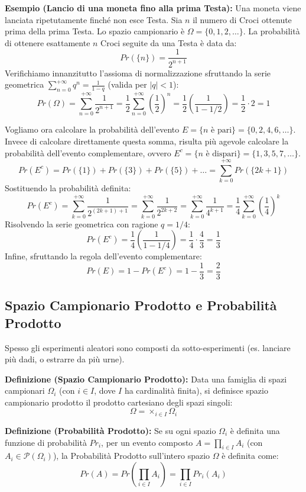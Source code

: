 \documentclass[12pt, a4paper]{article}
\begin{document}
\textbf{Esempio (Lancio di una moneta fino alla prima Testa):}
Una moneta viene lanciata ripetutamente finché non esce Testa. Sia $n$ il numero di Croci ottenute prima della prima Testa. Lo spazio campionario è $\Omega = \{0, 1, 2, \dots\}$.
La probabilità di ottenere esattamente $n$ Croci seguite da una Testa è data da:
$$ Pr(\{n\}) = \frac{1}{2^{n+1}} $$
Verifichiamo innanzitutto l'assioma di normalizzazione sfruttando la serie geometrica $\sum_{n=0}^{+\infty} q^n = \frac{1}{1-q}$ (valida per $|q| < 1$):
$$ Pr(\Omega) = \sum_{n=0}^{+\infty} \frac{1}{2^{n+1}} = \frac{1}{2} \sum_{n=0}^{+\infty} \left(\frac{1}{2}\right)^n = \frac{1}{2} \left( \frac{1}{1 - 1/2} \right) = \frac{1}{2} \cdot 2 = 1 $$

Vogliamo ora calcolare la probabilità dell'evento $E = \{n \text{ è pari}\} = \{0, 2, 4, 6, \dots\}$.
Invece di calcolare direttamente questa somma, risulta più agevole calcolare la probabilità dell'evento complementare, ovvero $E^c = \{n \text{ è dispari}\} = \{1, 3, 5, 7, \dots\}$.
$$ Pr(E^c) = Pr(\{1\}) + Pr(\{3\}) + Pr(\{5\}) + \dots = \sum_{k=0}^{+\infty} Pr(\{2k+1\}) $$
Sostituendo la probabilità definita:
$$ Pr(E^c) = \sum_{k=0}^{+\infty} \frac{1}{2^{(2k+1)+1}} = \sum_{k=0}^{+\infty} \frac{1}{2^{2k+2}} = \sum_{k=0}^{+\infty} \frac{1}{4^{k+1}} = \frac{1}{4} \sum_{k=0}^{+\infty} \left(\frac{1}{4}\right)^k $$
Risolvendo la serie geometrica con ragione $q = 1/4$:
$$ Pr(E^c) = \frac{1}{4} \left( \frac{1}{1 - 1/4} \right) = \frac{1}{4} \cdot \frac{4}{3} = \frac{1}{3} $$
Infine, sfruttando la regola dell'evento complementare:
$$ Pr(E) = 1 - Pr(E^c) = 1 - \frac{1}{3} = \frac{2}{3} $$

\subsection{Spazio Campionario Prodotto e Probabilità Prodotto}
Spesso gli esperimenti aleatori sono composti da sotto-esperimenti (es. lanciare più dadi, o estrarre da più urne). 

\textbf{Definizione (Spazio Campionario Prodotto):} Data una famiglia di spazi campionari $\Omega_i$ (con $i \in I$, dove $I$ ha cardinalità finita), si definisce spazio campionario prodotto il prodotto cartesiano degli spazi singoli:
$$ \Omega = \times_{i \in I} \Omega_i $$

\textbf{Definizione (Probabilità Prodotto):} Se su ogni spazio $\Omega_i$ è definita una funzione di probabilità $Pr_i$, per un evento composto $A = \prod_{i \in I} A_i$ (con $A_i \in \mathcal{P}(\Omega_i)$), la Probabilità Prodotto sull'intero spazio $\Omega$ è definita come:
$$ Pr(A) = Pr\left(\prod_{i \in I} A_i\right) = \prod_{i \in I} Pr_i(A_i) $$
\end{document}
